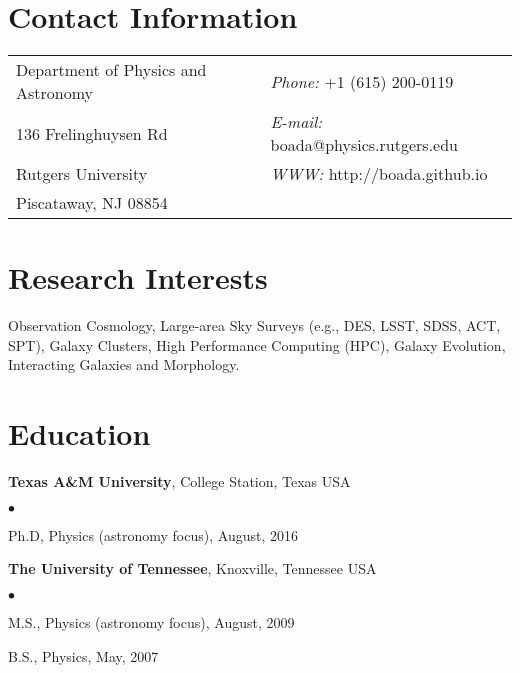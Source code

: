 \documentclass[margin,line, 11pt]{res}
\newenvironment{list2}{
  \begin{list}{$\bullet$}{%
      \setlength{\itemsep}{0in}
      \setlength{\parsep}{0in} \setlength{\parskip}{0in}
      \setlength{\topsep}{0in} \setlength{\partopsep}{0in}
      \setlength{\leftmargin}{0.2in}}}{\end{list}}
\begin{document}

\begin{resume}
\section{\sc Contact Information}
\vspace{.05in}
\begin{tabular}{@{}p{3in}p{3in}}
Department of Physics and Astronomy & {\it Phone:}  +1 (615) 200-0119 \\
136 Frelinghuysen Rd   & {\it E-mail:}  boada@physics.rutgers.edu \\
Rutgers University & {\it WWW:} http://boada.github.io \\
Piscataway, NJ 08854  & \\
\end{tabular}

\section{\sc Research Interests}
Observation Cosmology, Large-area Sky Surveys (e.g., DES, LSST, SDSS, ACT, SPT), Galaxy Clusters, High Performance Computing (HPC), Galaxy Evolution, Interacting Galaxies and Morphology.
\vspace*{-3mm}

\section{Education}
\textbf{Texas A\&M University}, College Station, Texas USA\\
\vspace*{-4mm}
\begin{list2}
	\item Ph.D, Physics (astronomy focus), August, 2016
\end{list2}
\vspace*{-4mm}

\textbf{The University of Tennessee}, Knoxville, Tennessee USA\\
\vspace*{-4mm}
\begin{list2}
	\item M.S., Physics (astronomy focus),  August, 2009
	\item B.S., Physics,  May, 2007
\end{list2}
\vspace*{-2.5mm}


\end{resume}
\end{document}
